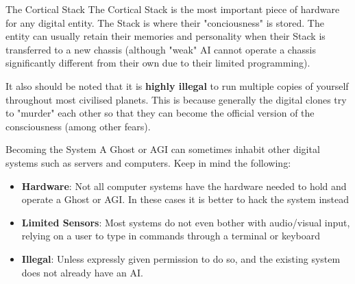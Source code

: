 \begin{genericsection}{The Cortical Stack}
The Cortical Stack is the most important piece of hardware for any digital entity. The Stack is where their "conciousness" is stored. The entity can usually retain their memories and personality when their Stack is transferred to a new chassis (although "weak" AI cannot operate a chassis significantly different from their own due to their limited programming).

It also should be noted that it is \textbf{highly illegal} to run multiple copies of yourself throughout most civilised planets. This is because generally the digital clones try to "murder" each other so that they can become the official version of the consciousness (among other fears).
\end{genericsection}

\begin{genericsection}{Becoming the System}
A Ghost or AGI can sometimes inhabit other digital systems such as servers and computers. Keep in mind the following:
\end{genericsection}

\begin{itemize}
  \item \textbf{Hardware}: Not all computer systems have the hardware needed to hold and operate a Ghost or AGI. In these cases it is better to hack the system instead\\
  \item \textbf{Limited Sensors}: Most systems do not even bother with audio/visual input, relying on a user to type in commands through a terminal or keyboard\\
  \item \textbf{Illegal}: Unless expressly given permission to do so, and the existing system does not already have an AI.\\
\end{itemize}
